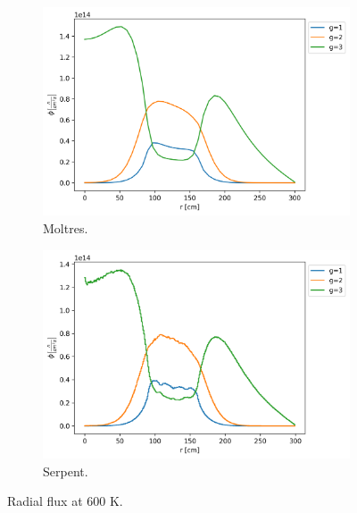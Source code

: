 \documentclass[11pt,letterpaper]{article}
\begin{document}
\begin{figure}[htbp!]
	\centering
	\begin{subfigure}[t]{0.4\textwidth}
		\centering
		\includegraphics[width=\linewidth]{figures-fullcore/3D-fullcore-600-15Gd-radial1}
		\caption{Moltres.}
	\end{subfigure}
	\begin{subfigure}[t]{0.4\textwidth}
		\centering
		\includegraphics[width=\linewidth]{figures-fullcore/serpent26G-600-collapse-Radial}
		\caption{Serpent.}
	\end{subfigure}
	\hfill
	\caption{Radial flux at 600 K.}
	\label{fig:fullcore-600-radial1}
\end{figure}
\end{document}
